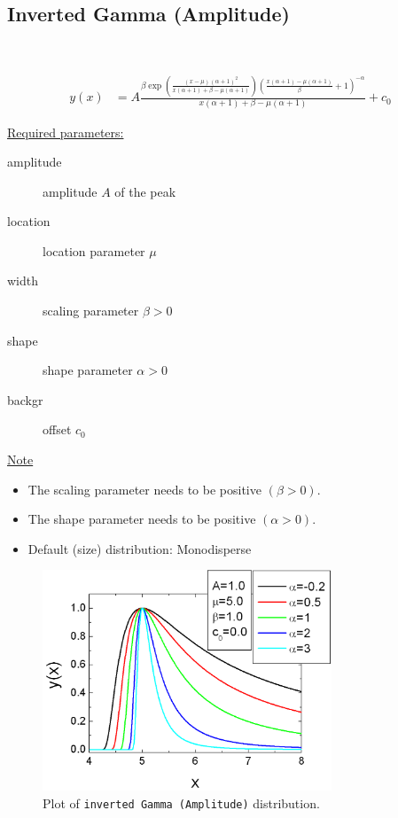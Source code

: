 \clearpage
\subsection{Inverted Gamma (Amplitude)} ~\\
\label{sec:InvertedGammaAmplitude}

\begin{align}
y(x) &= A\frac{\beta\exp\left(\frac{(x-\mu)(\alpha+1)^2}{x(\alpha+1)+\beta-\mu(\alpha+1)}\right)\left(\frac{x(\alpha+1)-\mu(\alpha+1)}{\beta}+1\right)^{-\alpha}}{x(\alpha+1)+\beta-\mu(\alpha+1)}
+c_0
\end{align}

\uline{Required parameters:}
\begin{description}
    \item[amplitude] amplitude $A$ of the peak
    \item[location] location parameter $\mu$
    \item[width] scaling parameter $\beta > 0$
    \item[shape] shape parameter $\alpha > 0$
    \item[backgr] offset $c_0$
\end{description}

\uline{Note}
\begin{itemize}
  \item The scaling parameter needs to be positive $(\beta > 0)$.
  \item The shape parameter needs to be positive $(\alpha > 0)$.
  \item Default (size) distribution: Monodisperse
\end{itemize}

\begin{figure}[htb]
\begin{center}
\includegraphics[width=0.768\textwidth]{invertedGammaAmplitude.png}
\end{center}
\caption{Plot of \texttt{inverted Gamma (Amplitude)} distribution.}
\label{fig:invertedGammaAmplitude}
\end{figure}

